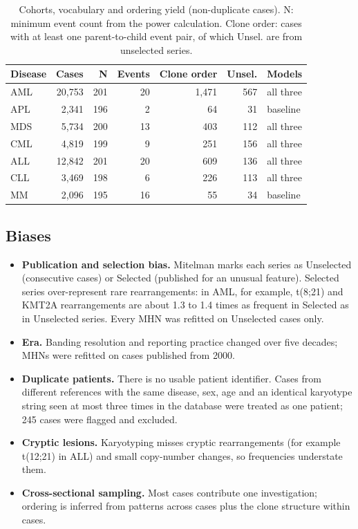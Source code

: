 \documentclass[conference]{IEEEtran}
\begin{document}
\begin{table}[!t]
\centering
\caption{Cohorts, vocabulary and ordering yield (non-duplicate cases). N: minimum event count from the power calculation. Clone order: cases with at least one parent-to-child event pair, of which Unsel. are from unselected series.}
\label{tab:data}
\footnotesize
\setlength{\tabcolsep}{3pt}
\begin{tabular}{lrrrrrl}
\toprule
\textbf{Disease} & \textbf{Cases} & \textbf{N} & \textbf{Events} & \textbf{Clone order} & \textbf{Unsel.} & \textbf{Models} \\
\midrule
AML & 20,753 & 201 & 20 & 1,471 & 567 & all three \\
APL & 2,341 & 196 & 2 & 64 & 31 & baseline \\
MDS & 5,734 & 200 & 13 & 403 & 112 & all three \\
CML & 4,819 & 199 & 9 & 251 & 156 & all three \\
ALL & 12,842 & 201 & 20 & 609 & 136 & all three \\
CLL & 3,469 & 198 & 6 & 226 & 113 & all three \\
MM & 2,096 & 195 & 16 & 55 & 34 & baseline \\
\bottomrule
\end{tabular}
\end{table}
\subsection{Biases}
\begin{itemize}
\item \textbf{Publication and selection bias.} Mitelman marks each series as Unselected (consecutive cases) or Selected (published for an unusual feature). Selected series over-represent rare rearrangements: in AML, for example, t(8;21) and KMT2A rearrangements are about 1.3 to 1.4 times as frequent in Selected as in Unselected series. Every MHN was refitted on Unselected cases only.
\item \textbf{Era.} Banding resolution and reporting practice changed over five decades; MHNs were refitted on cases published from 2000.
\item \textbf{Duplicate patients.} There is no usable patient identifier. Cases from different references with the same disease, sex, age and an identical karyotype string seen at most three times in the database were treated as one patient; 245 cases were flagged and excluded.
\item \textbf{Cryptic lesions.} Karyotyping misses cryptic rearrangements (for example t(12;21) in ALL) and small copy-number changes, so frequencies understate them.
\item \textbf{Cross-sectional sampling.} Most cases contribute one investigation; ordering is inferred from patterns across cases plus the clone structure within cases.
\end{itemize}
\end{document}
